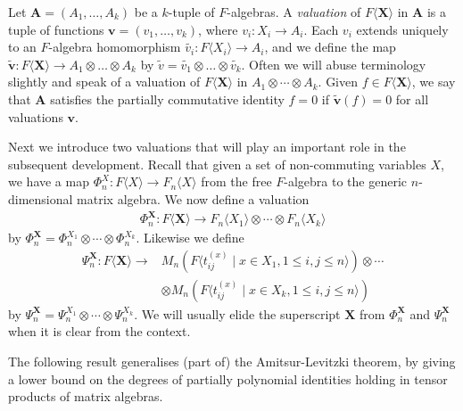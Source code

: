 \documentclass[runningheads]{llncs}
\begin{document}
Let $\boldsymbol{A}=(A_1,\ldots,A_k)$ be a $k$-tuple of $F$-algebras.
A \emph{valuation} of $F \langle \boldsymbol{X} \rangle$ in
$\boldsymbol{A}$ is a tuple of functions
$\boldsymbol{v}=(v_1,\ldots,v_k)$, where $v_i : X_i \rightarrow A_i$.
Each $v_i$ extends uniquely to an $F$-algebra homomorphism
$\widetilde{v_i} : F\langle X_i \rangle \rightarrow A_i$, and we
define the map $\widetilde{\boldsymbol{v}} : F \langle \boldsymbol{X}
\rangle \rightarrow A_1 \otimes \ldots \otimes A_k$ by
$\widetilde{v}=\widetilde{v_1} \otimes \ldots \otimes
\widetilde{v_k}$.  Often we will abuse terminology slightly and speak
of a valuation of $F \langle \boldsymbol{X} \rangle$ in $A_1 \otimes
\cdots \otimes A_k$.  Given $f \in F \langle \boldsymbol{X} \rangle$,
we say that $\boldsymbol{A}$ satisfies the partially commutative
identity $f=0$ if $\widetilde{\boldsymbol{v}}(f)=0$ for all valuations
$\boldsymbol{v}$.

Next we introduce two valuations that will play an important role in
the subsequent development.  Recall that given a set of non-commuting
variables $X$, we have a map $\Phi^X_n : F \langle X \rangle
\rightarrow F_n \langle X \rangle$ from the free $F$-algebra to the
generic $n$-dimensional matrix algebra.  We now define a valuation
\begin{gather}
\Phi^{\boldsymbol{X}}_n : F\langle \boldsymbol{X} \rangle \longrightarrow
F_n\langle X_1\rangle \otimes \cdots \otimes F_n\langle X_k\rangle 
\label{eq:psi}
\end{gather}
by $\Phi^{\boldsymbol{X}}_n = \Phi^{X_1}_{n} \otimes \cdots \otimes
\Phi_{n}^{X_k}$.    Likewise we
define
\begin{align*} \Psi^{\boldsymbol{X}}_n : F \langle \boldsymbol{X} \rangle
\longrightarrow
&  M_n(F\langle t_{ij}^{(x)}
\mid x \in X_1, 1 \leq i,j \leq n \rangle)  \otimes \cdots \\
& \otimes 
 M_n(F\langle t_{ij}^{(x)}
\mid x \in X_k, 1 \leq i,j \leq n \rangle)  
\end{align*}
by $\Psi_n^{\boldsymbol{X}} = \Psi_n^{X_1} \otimes \cdots \otimes \Psi_n^{X_k}$.
We will usually elide the superscript $\boldsymbol{X}$ from 
$\Phi^{\boldsymbol{X}}_n$ and  $\Psi_n^{\boldsymbol{X}}$ when it is clear from the 
context.

The following result generalises (part of) the Amitsur-Levitzki
theorem, by giving a lower bound on the degrees of partially
polynomial identities holding in tensor products of matrix algebras.
\end{document}
